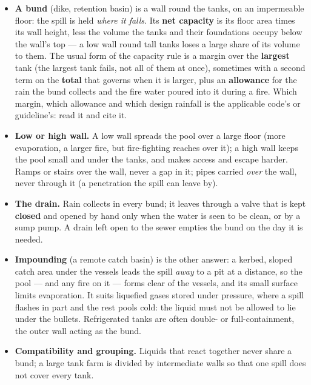 \documentclass[11pt,a4paper]{article}
\providecommand{\tightlist}{\setlength{\itemsep}{0pt}\setlength{\parskip}{0pt}}
\begin{document}
\begin{itemize}
\tightlist
\item
  \textbf{A bund} (dike, retention basin) is a wall round the tanks,
  on an impermeable floor: the spill is held \emph{where it falls}.
  Its \textbf{net capacity} is its floor area times its wall height,
  less the volume the tanks and their foundations occupy below the
  wall's top --- a low wall round tall tanks loses a large share of its
  volume to them. The usual form of the capacity rule is a margin over
  the \textbf{largest} tank (the largest tank fails, not all of them at
  once), sometimes with a second term on the \textbf{total} that governs
  when it is larger, plus an \textbf{allowance} for the rain the bund
  collects and the fire water poured into it during a fire. Which
  margin, which allowance and which design rainfall is the applicable
  code's or guideline's: read it and cite it.
\item
  \textbf{Low or high wall.} A low wall spreads the pool over a large
  floor (more evaporation, a larger fire, but fire-fighting reaches over
  it); a high wall keeps the pool small and under the tanks, and makes
  access and escape harder. Ramps or stairs over the wall, never a gap
  in it; pipes carried \emph{over} the wall, never through it (a
  penetration the spill can leave by).
\item
  \textbf{The drain.} Rain collects in every bund; it leaves through a
  valve that is kept \textbf{closed} and opened by hand only when the
  water is seen to be clean, or by a sump pump. A drain left open to
  the sewer empties the bund on the day it is needed.
\item
  \textbf{Impounding} (a remote catch basin) is the other answer: a
  kerbed, sloped catch area under the vessels leads the spill
  \emph{away} to a pit at a distance, so the pool --- and any fire on it
  --- forms clear of the vessels, and its small surface limits
  evaporation. It suits liquefied gases stored under pressure, where a
  spill flashes in part and the rest pools cold: the liquid must not be
  allowed to lie under the bullets. Refrigerated tanks are often
  double- or full-containment, the outer wall acting as the bund.
\item
  \textbf{Compatibility and grouping.} Liquids that react together
  never share a bund; a large tank farm is divided by intermediate
  walls so that one spill does not cover every tank.
\end{itemize}
\end{document}
